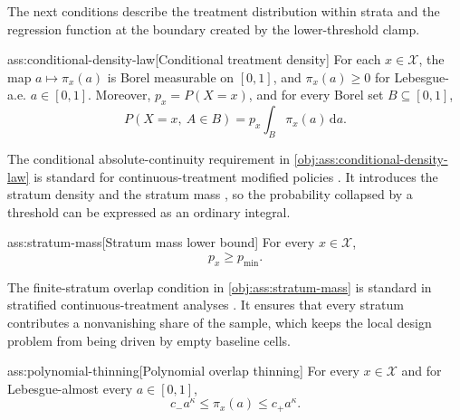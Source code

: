 \documentclass[11pt]{article}
\begin{document}
The next conditions describe the treatment distribution within strata and the regression function at the boundary created by the lower-threshold clamp.

\begin{assumptionv}{ass:conditional-density-law}[Conditional treatment density]
For each \(x\in\mathcal X\), the map \(a\mapsto \pi_x(a)\) is Borel measurable on \([0,1]\), and \(\pi_x(a)\ge 0\) for Lebesgue-a.e. \(a\in[0,1]\). Moreover, \(p_x=P(X=x)\), and for every Borel set \(B\subseteq[0,1]\),
\[
P(X=x,\ A\in B)=p_x\int_B \pi_x(a)\,\mathrm da .
\]
\end{assumptionv}

The conditional absolute-continuity requirement in \cref{obj:ass:conditional-density-law} is standard for continuous-treatment modified policies \citep{DiazWilliamsHoffmanSchenck2023}. It introduces the stratum density  and the stratum mass , so the probability collapsed by a threshold can be expressed as an ordinary integral.

\begin{assumptionv}{ass:stratum-mass}[Stratum mass lower bound]
For every \(x\in\mathcal X\),
\[
p_x\geq p_{\min}.
\]
\end{assumptionv}

The finite-stratum overlap condition in \cref{obj:ass:stratum-mass} is standard in stratified continuous-treatment analyses \citep{DiazWilliamsHoffmanSchenck2023}. It ensures that every stratum contributes a nonvanishing share of the sample, which keeps the local design problem from being driven by empty baseline cells.

\begin{assumptionv}{ass:polynomial-thinning}[Polynomial overlap thinning]
For every \(x\in\mathcal X\) and for Lebesgue-almost every \(a\in[0,1]\),
\[
c_- a^\kappa \leq \pi_x(a) \leq c_+ a^\kappa .
\]
\end{assumptionv}
\end{document}
